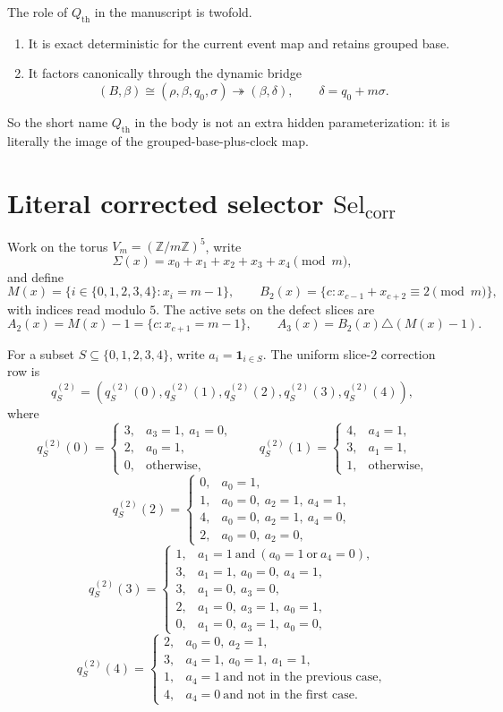 \documentclass[11pt]{article}
\newcommand{\Z}{\mathbb Z}
\newcommand{\SelCorr}{\mathrm{Sel}_{\mathrm{corr}}}
\begin{document}
The role of \(Q_{\mathrm{th}}\) in the manuscript is twofold.
\begin{enumerate}[label=\textup{(\arabic*)},leftmargin=2.8em]
\item It is exact deterministic for the current event map and retains grouped
      base.
\item It factors canonically through the dynamic bridge
      \[
      (B,\beta)\cong(\rho,\beta,q_0,\sigma)\twoheadrightarrow(\beta,\delta),
      \qquad
      \delta=q_0+m\sigma.
      \]
\end{enumerate}
So the short name \(Q_{\mathrm{th}}\) in the body is not an extra hidden
parameterization: it is literally the image of the grouped-base-plus-clock map.

\section{Literal corrected selector \texorpdfstring{\(\SelCorr\)}{SelCorr}}
\label{app:selcorr}

Work on the torus \(V_m=(\Z/m\Z)^5\), write
\[
\Sigma(x)=x_0+x_1+x_2+x_3+x_4\pmod m,
\]
and define
\[
M(x)=\{i\in\{0,1,2,3,4\}:x_i=m-1\},
\qquad
B_2(x)=\{c:x_{c-1}+x_{c+2}\equiv 2\pmod m\},
\]
with indices read modulo \(5\).
The active sets on the defect slices are
\[
A_2(x)=M(x)-1=\{c:x_{c+1}=m-1\},
\qquad
A_3(x)=B_2(x)\triangle(M(x)-1).
\]

For a subset \(S\subseteq\{0,1,2,3,4\}\), write \(a_i=\mathbf 1_{i\in S}\).
The uniform slice-\(2\) correction row is
\[
q^{(2)}_S=(q^{(2)}_S(0),q^{(2)}_S(1),q^{(2)}_S(2),q^{(2)}_S(3),q^{(2)}_S(4)),
\]
where
\[
q^{(2)}_S(0)=
\begin{cases}
3,& a_3=1,\ a_1=0,\\
2,& a_0=1,\\
0,& \text{otherwise,}
\end{cases}
\qquad
q^{(2)}_S(1)=
\begin{cases}
4,& a_4=1,\\
3,& a_1=1,\\
1,& \text{otherwise,}
\end{cases}
\]
\[
q^{(2)}_S(2)=
\begin{cases}
0,& a_0=1,\\
1,& a_0=0,\ a_2=1,\ a_4=1,\\
4,& a_0=0,\ a_2=1,\ a_4=0,\\
2,& a_0=0,\ a_2=0,
\end{cases}
\]
\[
q^{(2)}_S(3)=
\begin{cases}
1,& a_1=1\ \text{and}\ (a_0=1\ \text{or}\ a_4=0),\\
3,& a_1=1,\ a_0=0,\ a_4=1,\\
3,& a_1=0,\ a_3=0,\\
2,& a_1=0,\ a_3=1,\ a_0=1,\\
0,& a_1=0,\ a_3=1,\ a_0=0,
\end{cases}
\]
\[
q^{(2)}_S(4)=
\begin{cases}
2,& a_0=0,\ a_2=1,\\
3,& a_4=1,\ a_0=1,\ a_1=1,\\
1,& a_4=1\ \text{and not in the previous case},\\
4,& a_4=0\ \text{and not in the first case}.
\end{cases}
\]
\end{document}
